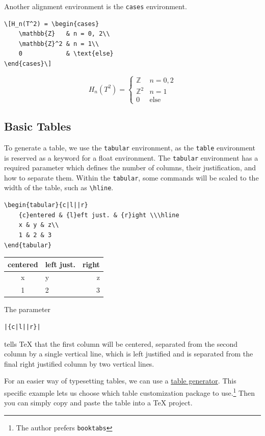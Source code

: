 \documentclass[twocolumn]{article}
\begin{document}
Another alignment environment is the \verb|cases| environment.
\begin{verbatim}
\[H_n(T^2) = \begin{cases}
    \mathbb{Z}   & n = 0, 2\\
    \mathbb{Z}^2 & n = 1\\
    0            & \text{else}
\end{cases}\]
\end{verbatim}
\[H_n(T^2) = \begin{cases}
    \mathbb{Z}   & n = 0, 2\\
    \mathbb{Z}^2 & n = 1\\
    0            & \text{else}
\end{cases}\]

\subsection{Basic Tables}
To generate a table, we use the \verb|tabular| environment, as the \verb|table| environment is reserved as a keyword for a float environment. The \verb|tabular| environment has a required parameter which defines the number of columns, their justification, and how to separate them. Within the \verb|tabular|, some commands will be scaled to the width of the table, such as \verb|\hline|.
\begin{verbatim}
\begin{tabular}{c|l||r}
    {c}entered & {l}eft just. & {r}ight \\\hline
    x & y & z\\
    1 & 2 & 3
\end{tabular}
\end{verbatim}

\begin{tabular}{c|l||r}
    {c}entered & {l}eft just. & {r}ight \\\hline
    x & y & z\\
    1 & 2 & 3
\end{tabular}

The parameter \begin{verbatim}|{c|l||r}|\end{verbatim} tells TeX that the first column will be centered, separated from the second column by a single vertical line, which is left justified and is separated from the final right justified column by two vertical lines.

For an easier way of typesetting tables, we can use a \href{https://www.tablesgenerator.com/}{table generator}. This specific example lets us choose which table customization package to use.\footnote{The author prefers \texttt{booktabs}} Then you can simply copy and paste the table into a TeX project.
\end{document}
